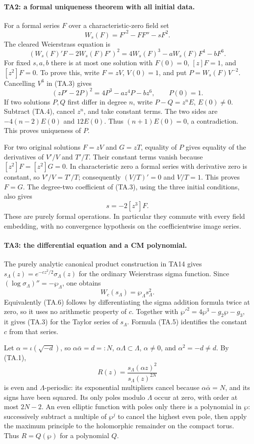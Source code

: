 \paragraph{TA2: a formal uniqueness theorem with all initial data.}
For a formal series $F$ over a characteristic-zero field set
\[
 W_s(F)=F'^2-FF''-sF^2.
\]
The cleared Weierstrass equation is
\[
 (W_s(F)'F-2W_s(F)F')^2
     =4W_s(F)^3-aW_s(F)F^4-bF^6.                               \tag{TA.3}
\]
For fixed $s,a,b$ there is at most one solution with
$F(0)=0$, $[z]F=1$, and $[z^2]F=0$. To prove this, write $F=zV$,
$V(0)=1$, and put $P=W_s(F)V^{-2}$. Cancelling $V^6$ in (TA.3)
gives
\[
 (zP'-2P)^2=4P^3-az^4P-bz^6,\qquad P(0)=1.                  \tag{TA.4}
\]
If two solutions $P,Q$ first differ in degree $n$, write
$P-Q=z^nE$, $E(0)\ne0$. Subtract (TA.4), cancel $z^n$,
and take constant terms. The two sides are
$-4(n-2)E(0)$ and $12E(0)$. Thus $(n+1)E(0)=0$, a
contradiction. This proves uniqueness of $P$.

For two original solutions $F=zV$ and $G=zT$, equality of $P$
gives equality of the derivatives of $V'/V$ and $T'/T$.
Their constant terms vanish because $[z^2]F=[z^2]G=0$.
In characteristic zero a formal series with derivative zero is
constant, so $V'/V=T'/T$; consequently $(V/T)'=0$ and
$V/T=1$. This proves $F=G$. The degree-two coefficient of
(TA.3), using the three initial conditions, also gives
\[
                         s=-2[z^3]F.                         \tag{TA.5}
\]
These are purely formal operations. In particular they commute
with every field embedding, with no convergence hypothesis on
the coefficientwise image series.

\paragraph{TA3: the differential equation and a CM polynomial.}
The purely analytic canonical product construction in TA14 gives
$s_\Lambda(z)=e^{-cz^2/2}\sigma_\Lambda(z)$ for the ordinary
Weierstrass sigma function. Since
$(\log\sigma_\Lambda)''=-\wp_\Lambda$, one obtains
\[
 W_c(s_\Lambda)=\wp_\Lambda s_\Lambda^2.                     \tag{TA.6}
\]
Equivalently (TA.6) follows by differentiating the sigma addition
formula twice at zero, so it uses no arithmetic property of $c$.
Together with $\wp'^2=4\wp^3-g_2\wp-g_3$, it gives (TA.3)
for the Taylor series of $s_\Lambda$. Formula (TA.5) identifies
the constant $c$ from that series.

Let $\alpha=\iota(\sqrt{-d})$, so
$\alpha\bar\alpha=d=:N$, $\alpha\Lambda\subset\Lambda$,
$\alpha\ne0$, and $\alpha^2=-d\ne d$. By (TA.1),
\[
 R(z)=\frac{s_\Lambda(\alpha z)^2}{s_\Lambda(z)^{2N}}         \tag{TA.7}
\]
is even and $\Lambda$-periodic: its exponential multipliers
cancel because $\alpha\bar\alpha=N$, and its signs have been
squared. Its only poles modulo $\Lambda$ occur at zero, with
order at most $2N-2$. An even elliptic function with poles only
there is a polynomial in $\wp$: successively subtract a multiple
of $\wp^j$ to cancel the highest even pole, then apply the
maximum principle to the holomorphic remainder on the compact
torus. Thus $R=Q(\wp)$ for a polynomial $Q$.

